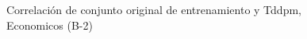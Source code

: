\begin{figure}[H]
    \centering
    
    \caption{Correlación de conjunto original de entrenamiento y Tddpm, Economicos (B-2)}
    \label{pairwise-economicos-b-2-tddpm_mlp}
\end{figure}
